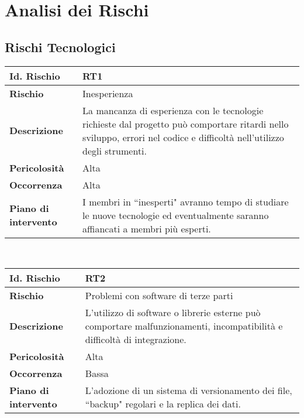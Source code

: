 \section{Analisi dei Rischi}

\subsection{Rischi Tecnologici}

\hypertarget{RT1}{}
\begin{tabular}{|L{4cm}|L{9.7cm}|}
    \hline
    \textbf{Id. Rischio} & \textbf{RT1} \\
    \hline
    \textbf{Rischio} & Inesperienza \\
    \hline
    \textbf{Descrizione} & La mancanza di esperienza con le tecnologie richieste dal progetto può comportare ritardi nello sviluppo, errori nel codice e difficoltà nell'utilizzo degli strumenti. \\
    \hline
    \textbf{Pericolosità} & Alta \\
    \hline
    \textbf{Occorrenza} & Alta \\
    \hline
    \textbf{Piano di intervento} & I membri in ``inesperti" avranno tempo di studiare le nuove tecnologie ed eventualmente saranno affiancati a membri più esperti. \\
    \hline
\end{tabular}
\\[30pt]
\hypertarget{RT2}{}
\begin{tabular}{|L{4cm}|L{9.7cm}|}
    \hline
    \textbf{Id. Rischio} & \textbf{RT2} \\
    \hline
    \textbf{Rischio} & Problemi con software di terze parti \\
    \hline
    \textbf{Descrizione} & L'utilizzo di software o librerie esterne può comportare malfunzionamenti, incompatibilità e difficoltà di integrazione. \\
    \hline
    \textbf{Pericolosità} & Alta \\
    \hline
    \textbf{Occorrenza} & Bassa \\
    \hline
    \textbf{Piano di intervento} & L'adozione di un sistema di versionamento dei file, ``backup" regolari e la replica dei dati. \\
    \hline
\end{tabular}
\\[30pt]
\hypertarget{RT3}{}
